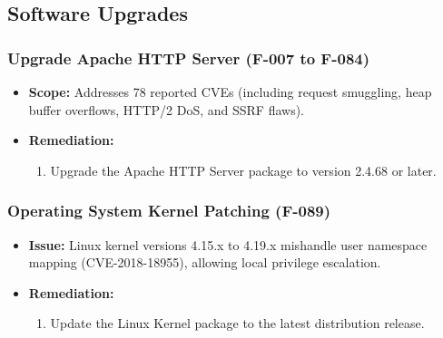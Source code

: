 \subsection{Software Upgrades}

\subsubsection{Upgrade Apache HTTP Server (F-007 to F-084)}
\begin{itemize}
    \item \textbf{Scope:} Addresses 78 reported CVEs (including request smuggling, heap buffer overflows, HTTP/2 DoS, and SSRF flaws).
    \item \textbf{Remediation:}
    \begin{enumerate}
        \item Upgrade the Apache HTTP Server package to version 2.4.68 or later.
    \end{enumerate}
\end{itemize}

\subsubsection{Operating System Kernel Patching (F-089)}
\begin{itemize}
    \item \textbf{Issue:} Linux kernel versions 4.15.x to 4.19.x mishandle user namespace mapping (CVE-2018-18955), allowing local privilege escalation.
    \item \textbf{Remediation:}
    \begin{enumerate}
        \item Update the Linux Kernel package to the latest distribution release.
    \end{enumerate}
\end{itemize}